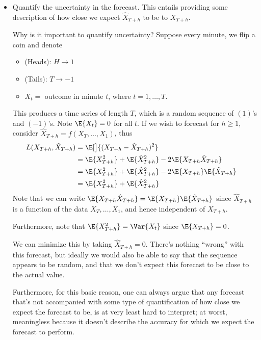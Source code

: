 \begin{itemize}
    \item Quantify the uncertainty in the forecast.
          This entails providing some description of how close
          we expect $ \hat{X}_{T+h} $ to be to $ X_{T+h} $.
          \begin{Example}{Why is it important to quantify uncertainty?}{}
              Suppose every minute, we flip a coin and denote
              \begin{itemize}
                  \item (Heads): $ H\to 1 $
                  \item (Tails): $ T\to -1 $
                  \item $ X_t= $ outcome in minute $ t $,
                        where $ t=1,\ldots,T $.
              \end{itemize}
              This produces a time series of length $ T $, which is a random
              sequence of $ (1) $'s and $ (-1) $'s. Note $ \E{X_t}=0 $ for all
              $ t $.
              If we wish to forecast for $ h\ge 1 $,
              consider $ \hat{X}_{T+h}=f(X_T,\ldots,X_1) $, thus
              \begin{align*}
                  L(X_{T+h},\hat{X}_{T+h})
                   & =\E[\big]{(X_{T+h}-\hat{X}_{T+h})^2}                               \\
                   & =\E{X_{T+h}^2}+\E{\hat{X}_{T+h}^2}-2\E{X_{T+h}\hat{X}_{T+h}}       \\
                   & =\E{X_{T+h}^2}+\E{\hat{X}_{T+h}^2}-2\E{X_{T+h}}\E{\hat{X}_{T+h}} & \\
                   & =\E{X_{T+h}^2}+\E{\hat{X}_{T+h}^2}                                 \\
              \end{align*}
              Note that we can write $ \E{X_{T+h}\hat{X}_{T+h}}=\E{X_{T+h}}\E{\hat{X}_{T+h}} $ since
              $ \hat{X}_{T+h} $ is a function of the data
              $ X_T,\ldots,X_1 $, and hence independent of $ X_{T+h} $.

              Furthermore, note that
              $ \E{X_{T+h}^2}=\Var{X_t} $ since $ \E{X_{T+h}}=0 $.



              We can minimize this by taking $ \hat{X}_{T+h}=0 $. There's
              nothing ``wrong'' with this forecast, but ideally
              we would also be able to say that the sequence appears to be random,
              and that we don't expect this forecast to be close to the actual value.

                  {\color{blue}Furthermore, for this basic reason, one can always
                      argue that any forecast that's not accompanied with some
                      type of quantification of how close we expect the forecast to be,
                      is at very least hard to interpret; at worst, meaningless
                      because it doesn't
                      describe the accuracy for which we expect the forecast to perform.}
          \end{Example}
\end{itemize}
